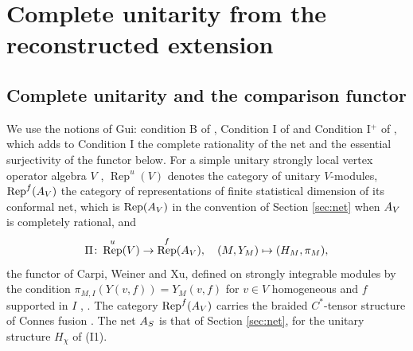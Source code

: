 \documentclass[leqno]{article}
\let\cal\relax
\newcommand{\cal}{\mathcal}
\newcommand{\co}{\colon}
\DeclareMathOperator{\Rep}{Rep}
\numberwithin{equation}{section}
\begin{document}
\section{Complete unitarity from the reconstructed extension}
\label{sec:unitarity}

\subsection{Complete unitarity and the comparison functor}
\label{subsec:complete-unitarity}

We use the notions of Gui: condition B of \cite[Section 3.4 p.~44]{Gui26}, Condition I of \cite[Definition 4.15 p.~41]{Gui25} and Condition I$^+$ of \cite[Definition 6.17 p.~70]{Gui25}, which adds to Condition I the complete rationality of the net and the essential surjectivity of the functor below. For a simple unitary strongly local vertex operator algebra $V$ \cite[Section 6]{CKLW18}, $\Rep^u(V)$ denotes the category of unitary $V$-modules, $\Rep^f(\cal A_V)$ the category of representations of finite statistical dimension of its conformal net, which is $\Rep(\cal A_V)$ in the convention of Section \ref{sec:net} when $\cal A_V$ is completely rational, and
\[
\Pi \co \Rep^u(V) \to \Rep^f(\cal A_V),
\quad
(M,Y_M) \mapsto (\cal H_M,\pi_M),
\]
the functor of Carpi, Weiner and Xu, defined on strongly integrable modules by the condition $\pi_{M,I}(Y(v,f)) = Y_M(v,f)$ for $v \in V$ homogeneous and $f$ supported in $I$ \cite[(3.8) p.~41]{Gui26}, \cite[Definition 4.22 and Theorem 4.24 p.~43]{Gui25}. The category $\Rep^f(\cal A_V)$ carries the braided $C^*$-tensor structure of Connes fusion \cite{Gui21a,Gui26}. The net $\cal A_S$ is that of Section \ref{sec:net}, for the unitary structure $H_\chi$ of (I1).
\end{document}
